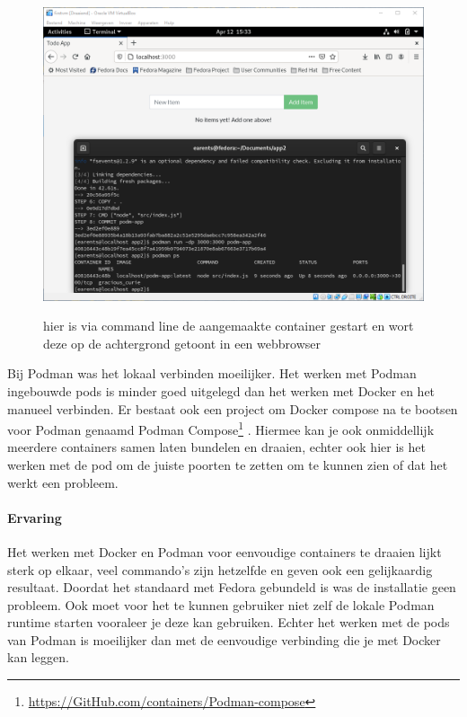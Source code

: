 \begin{figure}[h]
    \includegraphics[width=\linewidth]{img/podmanrun.png}
    \label{fig:podmanrun}
    \caption[Podman die een web ap uitvoert]{hier is via command line de aangemaakte container gestart en wort deze op de achtergrond getoont in een webbrowser}
    \centering
\end{figure}

Bij Podman was het lokaal verbinden moeilijker. Het werken met Podman ingebouwde pods is minder goed uitgelegd dan het werken met Docker en het manueel verbinden.  Er bestaat ook een project om Docker compose na te bootsen voor Podman genaamd Podman Compose\footnote{\url{https://GitHub.com/containers/Podman-compose}} .  Hiermee kan je ook onmiddellijk meerdere containers samen laten bundelen en draaien, echter ook hier is het werken met de pod om de juiste poorten te zetten om te kunnen zien of dat het werkt een probleem.

\paragraph{Ervaring}
Het werken met Docker en Podman voor eenvoudige containers te draaien lijkt sterk op elkaar, veel commando’s zijn hetzelfde en geven ook een gelijkaardig resultaat. Doordat het standaard met Fedora gebundeld is was de installatie geen probleem. Ook moet voor het te kunnen gebruiker niet zelf de lokale Podman runtime starten vooraleer je deze kan gebruiken. Echter het werken met de pods van Podman is moeilijker dan met de eenvoudige verbinding die je met Docker kan leggen.

